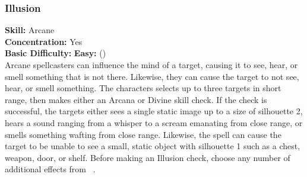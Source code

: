 \subsubsection{Illusion}
\textbf{Skill:} Arcane\\
\textbf{Concentration:} Yes\\
\textbf{Basic Difficulty:} \textbf{Easy:} (\difficulty)\\
Arcane spellcasters can influence the mind of a target, causing
it to see, hear, or smell something that is not there. Likewise, they can cause
the target to not see, hear, or smell something.  The characters selects up to
three targets in short range, then makes either an Arcana or Divine skill check.
If the check is successful, the targets either sees a single static image up to
a size of silhouette 2, hears a sound ranging from a whisper to a scream emanating
from close range, or smells something wafting from close range. Likewise, the spell
can cause the target to be unable to see a small, static object with silhouette 1
such as a chest, weapon, door, or shelf. Before making an Illusion check, choose
any number of additional effects from ~.
